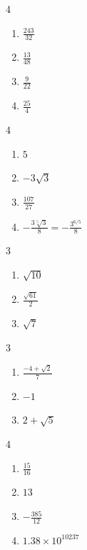 \documentclass{ximera}
\begin{document}
\begin{multicols}{4}
\begin{enumerate}
\setcounter{enumi}{\value{HW}}

\item  $\frac{243}{32}$
\item  $\frac{13}{48}$
\item  $\frac{9}{22}$
\item  $\frac{25}{4}$

\setcounter{HW}{\value{enumi}}
\end{enumerate}
\end{multicols}

\begin{multicols}{4}
\begin{enumerate}
\setcounter{enumi}{\value{HW}}

\item  $5$
\item  $-3\sqrt{3}$
\item  $\frac{107}{27}$
\item  $-\frac{3\sqrt[5]{3}}{8} = -\frac{3^{6/5}}{8}$

\setcounter{HW}{\value{enumi}}
\end{enumerate}
\end{multicols}


\begin{multicols}{3}
\begin{enumerate}
\setcounter{enumi}{\value{HW}}

\item  $\sqrt{10}$
\item  $\frac{\sqrt{61}}{2}$ 
\item  $\sqrt{7}$

\setcounter{HW}{\value{enumi}}
\end{enumerate}
\end{multicols}

\begin{multicols}{3}
\begin{enumerate}
\setcounter{enumi}{\value{HW}}

\item  $\frac{-4 + \sqrt{2}}{7}$
\item  $-1$
\item  $2 + \sqrt{5}$

\setcounter{HW}{\value{enumi}}
\end{enumerate}
\end{multicols}

\begin{multicols}{4}
\begin{enumerate}
\setcounter{enumi}{\value{HW}}

\item $\frac{15}{16}$
\item $13$
\item $-\frac{385}{12}$

\item $1.38 \times 10^{10237}$
\end{enumerate}
\end{multicols}
\end{document}
